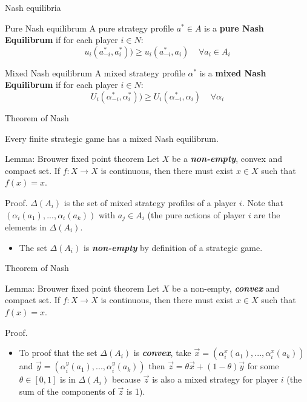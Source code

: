\documentclass{beamer}
\begin{document}
\begin{frame}{Nash equilibria}
\begin{block}{Pure Nash equilibrum}
A pure strategy profile $a^* \in A$ is a \textbf{pure Nash Equilibrum} if for each player $i\in N$:
$$u_i(a_{-i}^*,a_i^*)) \geq u_i(a_{-i}^*, a_i) \;\;\;\; \forall a_i \in A_i$$
\end{block}

\begin{block}{Mixed Nash equilibrum}
A mixed strategy profile $\alpha^*$ is a \textbf{mixed Nash Equilibrum} if for each player $i \in N$:
$$U_i(\alpha_{-i}^*,\alpha_i^*)) \geq U_i(\alpha_{-i}^*, \alpha_i) \;\;\;\; \forall \alpha_i$$
\end{block}

\end{frame}


\begin{frame}{Theorem of Nash}
\begin{theorem}
Every finite strategic game has a mixed Nash equilibrum.
\end{theorem}
\begin{block}{Lemma: Brouwer fixed point theorem}
Let $X$ be a \emph{\textbf{non-empty}}, convex and compact set. If $f : X \rightarrow X$ is continuous, then there must exist $x \in X$ such that $f(x) = x$.
\end{block}
\begin{block}{Proof.}
$\Delta(A_i)$ is the set of mixed strategy profiles of a player $i$. Note that $(\alpha_i(a_1),..., \alpha_i(a_k))$ with $a_j \in A_i$ (the pure actions of player $i$ are the elements in
$\Delta(A_i)$.
\pause
\begin{itemize}
        \item The set $\Delta(A_i)$ is \textbf{\emph{non-empty}} by definition of a strategic game.
\end{itemize}
\end{block}
\end{frame}


\begin{frame}{Theorem of Nash}
\begin{block}{Lemma: Brouwer fixed point theorem}
Let $X$ be a non-empty, \textbf{\emph{convex}} and compact set. If $f : X \rightarrow X$ is continuous, then there must exist $x \in X$ such that $f(x) = x$.
\end{block}
\begin{block}{Proof.}
\begin{itemize}
         \item To proof that the set $\Delta(A_i)$ is \textbf{\emph{convex}}, take $\vec{x} = (\alpha^x_i(a_1),...,\alpha^x_i(a_k))$ and $\vec{y} = (\alpha^y_i(a_1),...,\alpha^y_i(a_k))$ then $\vec{z} = \theta\vec{x} + (1 - \theta)\vec{y}$ for some $\theta \in [0,1]$ is in $\Delta(A_i)$ because $\vec{z}$ is also a mixed strategy for player $i$ (the sum of the components of $\vec{z}$ is 1).
\end{itemize}
\end{block}
\end{frame}
\end{document}
